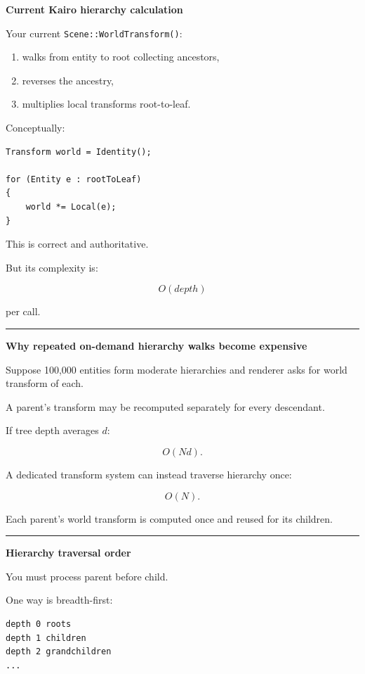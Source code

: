 \textbf{Current Kairo hierarchy calculation}

Your current \texttt{Scene::WorldTransform()}:

\begin{enumerate}
\def\labelenumi{\arabic{enumi}.}
\tightlist
\item
  walks from entity to root collecting ancestors,
\item
  reverses the ancestry,
\item
  multiplies local transforms root-to-leaf.
\end{enumerate}

Conceptually:

\begin{verbatim}
Transform world = Identity();

for (Entity e : rootToLeaf)
{
    world *= Local(e);
}
\end{verbatim}

This is correct and authoritative.

But its complexity is:

\[
O(depth)
\]

per call.

\begin{center}\rule{0.5\linewidth}{0.5pt}\end{center}

\textbf{Why repeated on-demand hierarchy walks become expensive}

Suppose 100,000 entities form moderate hierarchies and renderer asks for world transform of each.

A parent's transform may be recomputed separately for every descendant.

If tree depth averages \(d\):

\[
O(Nd).
\]

A dedicated transform system can instead traverse hierarchy once:

\[
O(N).
\]

Each parent's world transform is computed once and reused for its children.

\begin{center}\rule{0.5\linewidth}{0.5pt}\end{center}

\textbf{Hierarchy traversal order}

You must process parent before child.

One way is breadth-first:

\begin{verbatim}
depth 0 roots
depth 1 children
depth 2 grandchildren
...
\end{verbatim}

